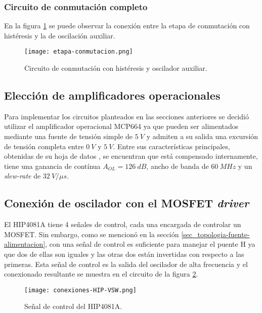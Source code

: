 \subsubsection{Circuito de conmutación completo}

En la figura \ref{fig:img_etapa-conmutacion} se puede observar la conexión entre la etapa de conmutación con histéresis y la de oscilación auxiliar.


\begin{figure}[H]
	\centering
	\texttt{[image: etapa-conmutacion.png]}
	\caption{Circuito de conmutación con histéresis y oscilador auxiliar.}
	\label{fig:img_etapa-conmutacion}
\end{figure}

\subsection{Elección de amplificadores operacionales}

Para implementar los circuitos planteados en las secciones anteriores se decidió utilizar el amplificador operacional MCP664 ya que pueden ser alimentados mediante una fuente de tensión simple de $5\:V$ y admiten a su salida una excursión de tensión completa entre $0\:V$ y $5\:V$. Entre sus características principales, obtenidas de su hoja de datos \cite{MCP660}, se encuentran que está compensado internamente, tiene una ganancia de contínua $A_{OL}=126\:dB$, ancho de banda de $60\:MHz$ y un \textsl{slew-rate} de $32\:V/\mu s$.

\subsection{Conexión de oscilador con el MOSFET \textsl{driver}}
El HIP4081A tiene 4 señales de control, cada una encargada de controlar un MOSFET. Sin embargo, como se mencionó en la sección \ref{sec_topologia-fuente-alimentacion}, con una señal de control es suficiente para manejar el puente H ya que dos de ellas son iguales y las otras dos están invertidas con respecto a las primeras. Esta señal de control es la salida del oscilador de alta frecuencia y el conexionado resultante se muestra en el circuito de la figura \ref{fig:img_control-HIP}.

\begin{figure}[H]
	\centering
	\texttt{[image: conexiones-HIP-VSW.png]}
	\caption{Señal de control del HIP4081A.}
	\label{fig:img_control-HIP}
\end{figure}


